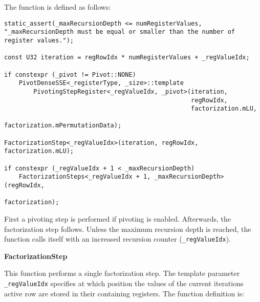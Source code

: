 The function is defined as follows:

\begin{verbatim}
static_assert(_maxRecursionDepth <= numRegisterValues,
"_maxRecursionDepth must be equal or smaller than the number of register values.");

const U32 iteration = regRowIdx * numRegisterValues + _regValueIdx;

if constexpr (_pivot != Pivot::NONE)
    PivotDenseSSE<_registerType, _size>::template 
        PivotingStepRegister<_regValueIdx, _pivot>(iteration, 
                                                   regRowIdx, 
                                                   factorization.mLU,
                                                   factorization.mPermutationData);

FactorizationStep<_regValueIdx>(iteration, regRowIdx, factorization.mLU);

if constexpr (_regValueIdx + 1 < _maxRecursionDepth)
    FactorizationSteps<_regValueIdx + 1, _maxRecursionDepth>(regRowIdx, 
                                                             factorization);
\end{verbatim}

First a pivoting step is performed if pivoting is enabled.
Afterwards, the factorization step follows.
Unless the maximum recursion depth is reached, the function calls itself with an increased recursion counter (\texttt{_regValueIdx}).




\vspace{1cm}
\textbf{FactorizationStep}
\vspace{0.5cm}

This function performs a single factorization step.
The template parameter \texttt{_regValueIdx} specifies at which position the values of the current iterations active row are stored in their containing registers.
The function definition is:

